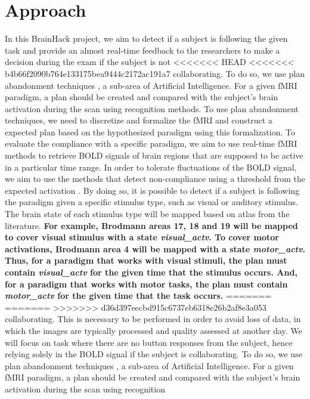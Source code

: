\documentclass[twocolumn]{bmcart}%
\begin{document}
\section{Approach}\label{approach}

In this BrainHack project, we aim to detect if a subject is following
the given task and provide an almost real-time feedback to the
researchers to make a decision during the exam if the subject is not
<<<<<<< HEAD
<<<<<<< b4b66f2090b764e133175bea9444c2172ac191a7
collaborating. To do so, we use plan abandonment techniques
\cite{Sukthankar2014}, a sub-area of Artificial Intelligence. For a
given fMRI paradigm, a plan should be created and compared with the
subject's brain activation during the scan using recognition methods. To
use plan abandonment techniques, we need to discretize and formalize the
fMRI and construct a expected plan based on the hypothesized paradigm
using this formalization. 
To evaluate the compliance with a specific paradigm, we aim to use real-time fMRI methods to retrieve BOLD signals of brain regions that are supposed to be active in a particular time range. 
In order to tolerate fluctuations of the BOLD signal, we aim to use the methods that detect non-compliance using a threshold from the expected activation \cite[Chap 4]{Sukthankar2014}. 
By doing so, it is possible to detect if a subject is following the paradigm given a specific stimulus type, such as visual or auditory
stimulus. The brain state of each stimulus type will be mapped based on atlas from the literature. \textbf{For example, Brodmann areas 17, 18 and 19
will be mapped to cover visual stimulus with a state
\emph{visual\_actv}. To cover motor activations, Brodmann area 4 will be mapped 
with a state \emph{motor\_actv}. 
Thus, for a paradigm that works with visual stimuli,
the plan must contain \emph{visual\_actv} for the given time that the
stimulus occurs. And, for a paradigm that works with motor tasks, the plan must contain \emph{motor\_actv} for the given time that the task occurs.}
=======
=======
>>>>>>> d36d397eecbd915c6737eb6318e26b2af8e3a053
collaborating. This is necessary to be performed in order to avoid loss
of data, in which the images are typically processed and quality
assessed at another day. We will focus on task where there are no button
responses from the subject, hence relying solely in the BOLD signal if
the subject is collaborating. To do so, we use plan abandonment
techniques \cite{Sukthankar2014}, a sub-area of Artificial Intelligence.
For a given fMRI paradigm, a plan should be created and compared with
the subject's brain activation during the scan using recognition
\end{document}
